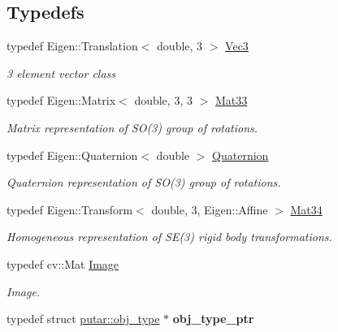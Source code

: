 \subsection*{Typedefs}
\begin{DoxyCompactItemize}
\item 
typedef Eigen\+::\+Translation$<$ double, 3 $>$ \hyperlink{namespaceputar_a4c3cbb84a7c44d90796f404d9e2c10dc}{Vec3}\hypertarget{namespaceputar_a4c3cbb84a7c44d90796f404d9e2c10dc}{}\label{namespaceputar_a4c3cbb84a7c44d90796f404d9e2c10dc}

\begin{DoxyCompactList}\small\item\em 3 element vector class \end{DoxyCompactList}\item 
typedef Eigen\+::\+Matrix$<$ double, 3, 3 $>$ \hyperlink{namespaceputar_aee57be2241e98d794717b88483857084}{Mat33}\hypertarget{namespaceputar_aee57be2241e98d794717b88483857084}{}\label{namespaceputar_aee57be2241e98d794717b88483857084}

\begin{DoxyCompactList}\small\item\em Matrix representation of S\+O(3) group of rotations. \end{DoxyCompactList}\item 
typedef Eigen\+::\+Quaternion$<$ double $>$ \hyperlink{namespaceputar_a80c20cdfaa95579ce0f4eaf85f609e31}{Quaternion}\hypertarget{namespaceputar_a80c20cdfaa95579ce0f4eaf85f609e31}{}\label{namespaceputar_a80c20cdfaa95579ce0f4eaf85f609e31}

\begin{DoxyCompactList}\small\item\em Quaternion representation of S\+O(3) group of rotations. \end{DoxyCompactList}\item 
typedef Eigen\+::\+Transform$<$ double, 3, Eigen\+::\+Affine $>$ \hyperlink{namespaceputar_a8bf3c8025ae8f60f553a752014c9849a}{Mat34}\hypertarget{namespaceputar_a8bf3c8025ae8f60f553a752014c9849a}{}\label{namespaceputar_a8bf3c8025ae8f60f553a752014c9849a}

\begin{DoxyCompactList}\small\item\em Homogeneous representation of S\+E(3) rigid body transformations. \end{DoxyCompactList}\item 
typedef cv\+::\+Mat \hyperlink{namespaceputar_a6b914df3faf7862e1bd631536309251a}{Image}\hypertarget{namespaceputar_a6b914df3faf7862e1bd631536309251a}{}\label{namespaceputar_a6b914df3faf7862e1bd631536309251a}

\begin{DoxyCompactList}\small\item\em Image. \end{DoxyCompactList}\item 
typedef struct \hyperlink{structputar_1_1obj__type}{putar\+::obj\+\_\+type} $\ast$ {\bfseries obj\+\_\+type\+\_\+ptr}\hypertarget{namespaceputar_a5c44aa91da318ae2ead9456c2f2de2ac}{}\label{namespaceputar_a5c44aa91da318ae2ead9456c2f2de2ac}

\end{DoxyCompactItemize}
